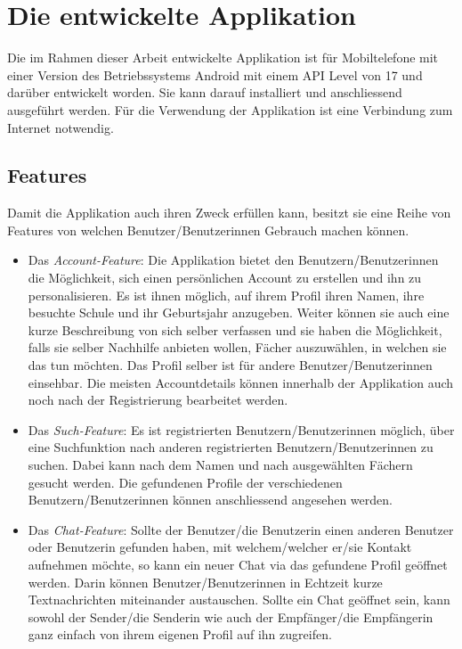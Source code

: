 \documentclass[a4paper,11pt]{report}
\begin{document}
		
		
	\chapter{Die entwickelte Applikation}
	Die im Rahmen dieser Arbeit entwickelte Applikation ist für Mobiltelefone mit einer Version des Betriebssystems Android mit einem API Level von 17 und darüber entwickelt worden. Sie kann darauf installiert und anschliessend ausgeführt werden. Für die Verwendung der Applikation ist eine Verbindung zum Internet notwendig.
	
	\section{Features}
	Damit die Applikation auch ihren Zweck erfüllen kann, besitzt sie eine Reihe von Features von welchen Benutzer/Benutzerinnen Gebrauch machen können.
	
	\begin{itemize}
		\item Das \emph{Account-Feature}: Die Applikation bietet den Benutzern/Benutzerinnen die Möglichkeit, sich einen persönlichen Account zu erstellen und ihn zu personalisieren. Es ist ihnen möglich, auf ihrem Profil ihren Namen, ihre besuchte Schule und ihr Geburtsjahr anzugeben. Weiter können sie auch eine kurze Beschreibung von sich selber verfassen und sie haben die Möglichkeit, falls sie selber Nachhilfe anbieten wollen, Fächer auszuwählen, in welchen sie das tun möchten. Das Profil selber ist für andere Benutzer/Benutzerinnen einsehbar. Die meisten Accountdetails können innerhalb der Applikation auch noch nach der Registrierung bearbeitet werden.
		\item Das \emph{Such-Feature}: Es ist registrierten Benutzern/Benutzerinnen möglich, über eine Suchfunktion nach anderen registrierten Benutzern/Benutzerinnen zu suchen. Dabei kann nach dem Namen und nach ausgewählten Fächern gesucht werden. Die gefundenen Profile der verschiedenen Benutzern/Benutzerinnen können anschliessend angesehen werden.
		\item Das \emph{Chat-Feature}: Sollte der Benutzer/die Benutzerin einen anderen Benutzer oder Benutzerin gefunden haben, mit welchem/welcher er/sie Kontakt aufnehmen möchte, so kann ein neuer Chat via das gefundene Profil geöffnet werden. Darin können Benutzer/Benutzerinnen in Echtzeit kurze Textnachrichten miteinander austauschen. Sollte ein Chat geöffnet sein, kann sowohl der Sender/die Senderin wie auch der Empfänger/die Empfängerin ganz einfach von ihrem eigenen Profil auf ihn zugreifen.
	\end{itemize}
\end{document}
